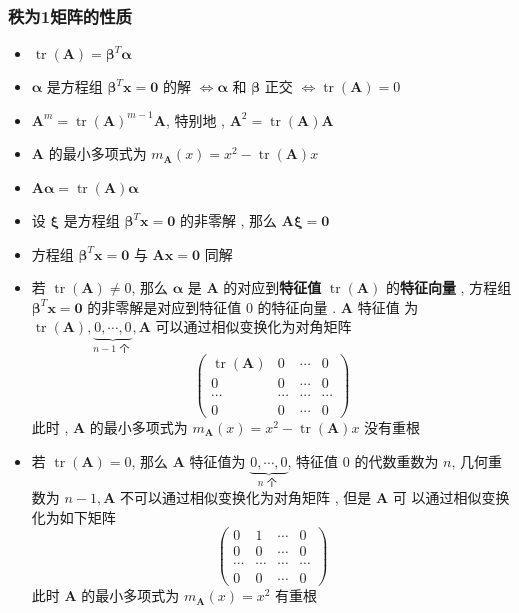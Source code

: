 \documentclass{article}
\begin{document}
			\subsubsection{秩为1矩阵的性质}
				\begin{itemize}
						\item $\operatorname{tr}(\boldsymbol A)= \boldsymbol \beta^{T} \boldsymbol \alpha$
						\item $\boldsymbol \alpha$ 是方程组 $ \boldsymbol \beta^{T} \boldsymbol x=\mathbf0$ 的解 $\Leftrightarrow \boldsymbol \alpha$ 和 $ \boldsymbol \beta$ 正交 $\Leftrightarrow \operatorname{tr}(\boldsymbol A)=0$
						\item $\boldsymbol A^{m}=\operatorname{tr}(\boldsymbol A)^{m-1} \boldsymbol A$, 特别地 , $\boldsymbol A^{2}=\operatorname{tr}(\boldsymbol A) \boldsymbol A$
						\item $\boldsymbol A$ 的最小多项式为 $m_{\boldsymbol A}(x)=x^{2}-\operatorname{tr}(\boldsymbol A) x$
						\item $\boldsymbol A \boldsymbol \alpha=\operatorname{tr}(\boldsymbol A) \boldsymbol \alpha$
						\item 设 $\boldsymbol \xi$ 是方程组 $ \boldsymbol \beta^{T}\boldsymbol x=\mathbf0$ 的非零解 , 那么 $\boldsymbol A \boldsymbol \xi=\mathbf0$
						\item 方程组 $ \boldsymbol \beta^{T} \boldsymbol x=\mathbf0$ 与 $\boldsymbol A \boldsymbol x=\mathbf0$ 同解
						\item 若 $\operatorname{tr}(\boldsymbol A) \neq 0$, 那么 $\boldsymbol \alpha$ 是 $\boldsymbol A$ 的对应到\textbf{特征值} $\operatorname{tr}(\boldsymbol A)$ 的\textbf{特征向量} , 方程组 $ \boldsymbol \beta^{T} \boldsymbol x=\mathbf0$ 的非零解是对应到特征值 0 的特征向量 . $\boldsymbol A$ 特征值 为 $\operatorname{tr}(\boldsymbol A), \underbrace{0, \cdots, 0}_{n-1 \text { 个 }}, \boldsymbol A$ 可以通过相似变换化为对角矩阵
						$$
						\left(\begin{array}{cccc}
							\operatorname{tr}(\boldsymbol A) & 0 & \cdots & 0 \\
							0 & 0 & \cdots & 0 \\
							\cdots & \cdots & \cdots & \cdots \\
							0 & 0 & \cdots & 0
						\end{array}\right)
						$$
						此时 , $\boldsymbol A$ 的最小多项式为 $m_{\boldsymbol A}(x)=x^{2}-\operatorname{tr}(\boldsymbol A) x$ 没有重根
						\item 若 $\operatorname{tr}(\boldsymbol A)=0$, 那么 $\boldsymbol A$ 特征值为 $\underbrace{0, \cdots, 0}_{n \text { 个 }}$, 特征值 0 的代数重数为 $n$, 几何重数为 $n-1, \boldsymbol A$ 不可以通过相似变换化为对角矩阵 , 但是 $\boldsymbol A$ 可 以通过相似变换化为如下矩阵
						$$
						\left(\begin{array}{cccc}
							0 & 1 & \cdots & 0 \\
							0 & 0 & \cdots & 0 \\
							\cdots & \cdots & \cdots & \cdots \\
							0 & 0 & \cdots & 0
						\end{array}\right)
						$$
						此时 $\boldsymbol A$ 的最小多项式为 $m_{\boldsymbol A}(x)=x^{2}$ 有重根
					\end{itemize}
\end{document}
